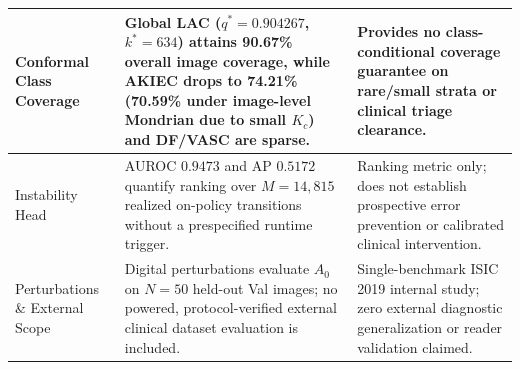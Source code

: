 \begin{table}[!htbp]
\begin{tabular}{@{}p{3.0cm}p{5.5cm}p{5.5cm}@{}}
Conformal Class Coverage & Global LAC ($q^* = 0.904267$, $k^*=634$) attains 90.67\% overall image coverage, while AKIEC drops to 74.21\% (70.59\% under image-level Mondrian due to small $K_c$) and DF/VASC are sparse. & Provides no class-conditional coverage guarantee on rare/small strata or clinical triage clearance. \\
\midrule
Instability Head & AUROC $0.9473$ and AP $0.5172$ quantify ranking over $M=14{,}815$ realized on-policy transitions without a prespecified runtime trigger. & Ranking metric only; does not establish prospective error prevention or calibrated clinical intervention. \\
\midrule
Perturbations \& External Scope & Digital perturbations evaluate $A_0$ on $N=50$ held-out Val images; no powered, protocol-verified external clinical dataset evaluation is included. & Single-benchmark ISIC 2019 internal study; zero external diagnostic generalization or reader validation claimed. \\
\bottomrule
\end{tabular}
\end{table}

